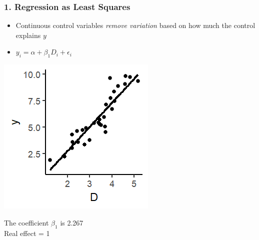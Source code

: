 \documentclass[xcolor=x11names,compress]{beamer}\usepackage[]{graphicx}\usepackage[]{color}
\makeatletter
\def\maxwidth{ %
  \ifdim\Gin@nat@width>\linewidth
    \linewidth
  \else
    \Gin@nat@width
  \fi
}
\newenvironment{knitrout}{}{} %
\renewcommand{\(}{\begin{columns}}
\renewcommand{\)}{\end{columns}}
\newcommand{\<}[1]{\begin{column}{#1}}
\renewcommand{\>}{\end{column}}
\makeatother
\begin{document}
\begin{frame}
\frametitle{1. Regression as Least Squares}
\begin{itemize}
\item Continuous control variables \textit{remove variation} based on how much the control explains $y$
\pause
\item $y_i = \alpha + \beta_1 D_i + \epsilon_i$
\end{itemize}
\begin{multicols}{2}
\begin{knitrout}
\color{fgcolor}
\includegraphics[width=\maxwidth]{figure/graph_ols_control1-1} 

\end{knitrout}
\columnbreak
\pause

The coefficient $\beta_1$ is 2.267 \\
Real effect = 1
\end{multicols}
\end{frame}
\end{document}
